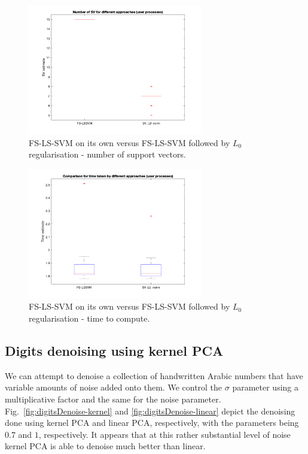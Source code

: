 \documentclass[10pt,a4paper]{article}
\begin{document}
\begin{figure}[h!]
\centering
  \includegraphics[width=3in]{SVestimComp.png}
  \caption{FS-LS-SVM on its own versus FS-LS-SVM followed by $L_0$ regularisation - number of support vectors.}
  \label{fig:SVestimComp}
\end{figure}

\begin{figure}[h!]
\centering
  \includegraphics[width=3in]{TimeEstimComp.png}
  \caption{FS-LS-SVM on its own versus FS-LS-SVM followed by $L_0$ regularisation - time to compute.}
  \label{fig:TimeEstimComp}
\end{figure}

\subsection{Digits denoising using kernel PCA}
We can attempt to denoise a collection of handwritten Arabic numbers that have variable amounts of noise added onto them. We control the $\sigma$ parameter using a multiplicative factor and the same for the noise parameter. Fig.~\ref{fig:digitsDenoise-kernel} and \ref{fig:digitsDenoise-linear} depict the denoising done using kernel PCA and linear PCA, respectively, with the parameters being $0.7$ and $1$, respectively. It appears that at this rather substantial level of noise kernel PCA is able to denoise much better than linear.
\end{document}
